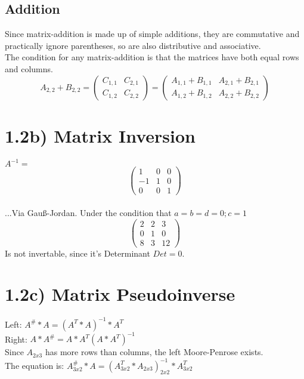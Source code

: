 \documentclass{article}
\begin{document}
	\subsection{Addition}
	Since matrix-addition is made up of simple additions, they are commutative and practically ignore parentheses, so are also distributive and associative.\\
	The condition for any matrix-addition is that the matrices have both equal rows and columns.\\
	\begin{equation*} 
		A_{2,2}+B_{2,2}=
		\begin{pmatrix}
			C_{1,1} & C_{2,1} \\
			C_{1,2} & C_{2,2}
		\end{pmatrix}
		=
	\begin{pmatrix}
		A_{1,1}+B_{1,1} & A_{2,1}+B_{2,1} \\
		A_{1,2}+B_{1,2} & A_{2,2}+B_{2,2}
	\end{pmatrix}
	\end{equation*}

\section{1.2b) Matrix Inversion}
	$A^{-1} =$ \begin{equation*}
		\begin{pmatrix}
			 1 & 0 & 0 \\
			-1 & 1 & 0 \\
			 0 & 0 & 1
		\end{pmatrix}
	\end{equation*} \\
	...Via Gauß-Jordan. Under the condition that $a=b=d=0; c=1$\\
	\begin{equation*}
		\begin{pmatrix}
			2 & 2 &  3 \\
			0 & 1 &  0 \\
			8 & 3 & 12
		\end{pmatrix}
	\end{equation*}
	Is not invertable, since it's Determinant $Det = 0$.
	
	\section{1.2c) Matrix Pseudoinverse}
	Left: $A^\# * A = (A^T * A)^{-1} * A^T$ \\
	Right: $A * A^\# = A * A^T (A * A^T)^{-1}$\\
	Since $A_{2x3}$ has more rows than columns, the left Moore-Penrose exists.\\
	The equation is: $A^\#_{3x2} * A = (A^T_{3x2} * A_{2x3})^{-1}_{2x2} * A^T_{3x2}$
	
\end{document}
